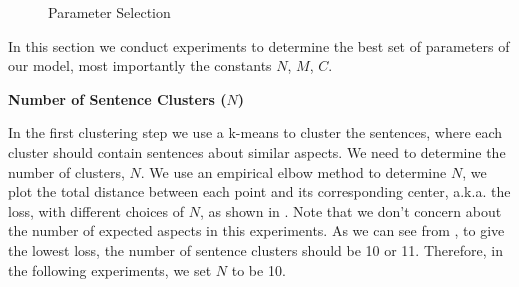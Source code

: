 \begin{figure}[th!]
	\vfill
	\caption{Parameter Selection}
\end{figure}
In this section we conduct experiments to determine the best set of
parameters of our model, most importantly the constants $N$, $M$, $C$.

\textbf{Number of Sentence Clusters ($N$)}

In the first clustering step we use a k-means to cluster the sentences,
where each cluster should contain sentences about similar aspects.
We need to determine the number of clusters, $N$.
We use an empirical elbow method to determine $N$, 
we plot the total distance between each point and its corresponding center,
a.k.a. the loss, with different choices of $N$, 
as shown in .
Note that we don't concern about the number of expected aspects 
in this experiments. 
As we can see from ,
to give the lowest loss, the number of sentence clusters should be
10 or 11.  Therefore, in the following experiments, we set $N$ to be 10.

